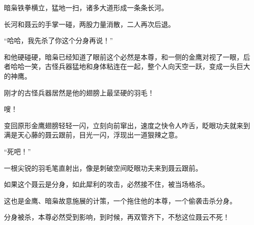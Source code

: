 \begin{this_body}
暗枭铁拳横立，猛地一扫，诸多大道形成一条条长河。

长河和聂云的手掌一碰，两股力量消散，二人再次后退。

“哈哈，我先杀了你这个分身再说！”

和他硬碰硬，暗枭已经知道了眼前这个必然是本尊，和一侧的金鹰对视了一眼，后者哈哈一笑，古怪兵器猛地和身体粘连在一起，整个人向天空一跃，变成一头巨大的神鹰。

刚才的古怪兵器居然是他的翅膀上最坚硬的羽毛！

嗖！

变回原形金鹰翅膀轻轻一闪，立刻向前窜出，速度之快令人咋舌，眨眼功夫就来到满是天心藤的聂云跟前，目光一闪，浮现出一道狠辣之意。

“死吧！”

一根尖锐的羽毛笔直射出，像是刺破空间眨眼功夫来到聂云跟前。

如果这个聂云是分身，如此犀利的攻击，必然接不住，被当场格杀。

这也是金鹰、暗枭故意施展的计策，一个拖住他的本尊，一个偷袭击杀分身。

分身被杀，本尊必然受到影响，到时候，再双管齐下，不愁这位聂云不死！

\end{this_body}

